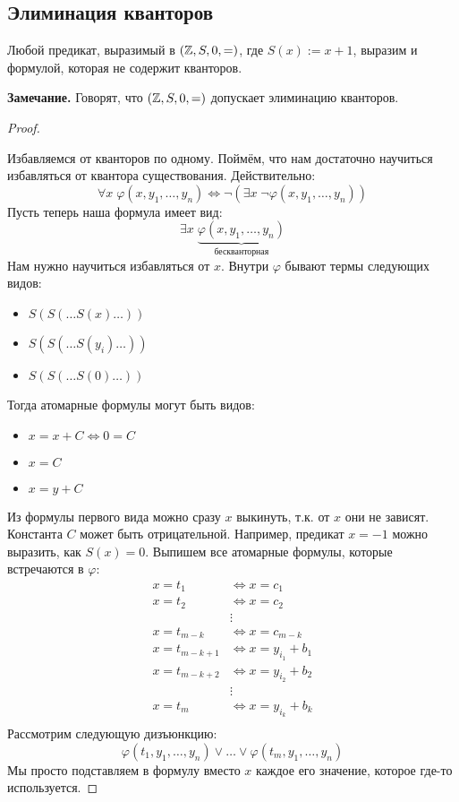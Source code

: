 \subsection{Элиминация кванторов}
\begin{theorem}
    Любой предикат, выразимый в $(\mathbb{Z}, S, 0, =)$, где $S(x) := x + 1$, выразим и формулой, которая не содержит кванторов.
\end{theorem}
\textbf{Замечание. } Говорят, что $(\mathbb{Z}, S, 0, =)$ допускает элиминацию кванторов.
\begin{proof} $ $
     
    Избавляемся от кванторов по одному. Поймём, что нам достаточно научиться избавляться от квантора существования. Действительно:
    $$ \forall x \; \varphi(x, y_1, \dots, y_n) \Longleftrightarrow \lnot \left(\exists x \; \lnot \varphi(x, y_1, \dots, y_n) \right)$$
    Пусть теперь наша формула имеет вид:
    $$ \exists x \; \underbrace{\varphi(x, y_1, \dots, y_n)}_{\text{бескванторная}} $$
    Нам нужно научиться избавляться от $x$. Внутри $\varphi$ бывают термы следующих видов:
    \begin{itemize}
        \item $S(S(\dots S(x)\dots))$
        \item $S(S(\dots S(y_i)\dots))$
        \item $S(S(\dots S(0)\dots))$
    \end{itemize}
    Тогда атомарные формулы могут быть видов:
    \begin{itemize}
        \item $x = x + C \Leftrightarrow 0 = C$
        \item $x = C$
        \item $x = y + C$
    \end{itemize}
    Из формулы первого вида можно сразу $x$ выкинуть, т.к. от $x$ они не зависят. Константа $C$ может быть отрицательной. Например, предикат $x = -1$ можно выразить, как $S(x) = 0$.
    Выпишем все атомарные формулы, которые встречаются в $\varphi$:
    \begin{align*}
        x = t_1 & \Leftrightarrow x = c_1 \\
        x = t_2 & \Leftrightarrow x = c_2 \\
        & \vdots \\
        x = t_{m-k} & \Leftrightarrow x = c_{m-k} \\
        x = t_{m-k+1} & \Leftrightarrow x = y_{i_1} + b_1 \\
        x = t_{m-k+2} & \Leftrightarrow x = y_{i_2} + b_2 \\
        & \vdots \\
        x = t_m & \Leftrightarrow x = y_{i_k} + b_k \\
    \end{align*}
    Рассмотрим следующую дизъюнкцию:
    $$ \varphi(t_1, y_1, \dots, y_n) \vee \dots \vee \varphi(t_m, y_1, \dots, y_n) $$
    Мы просто подставляем в формулу вместо $x$ каждое его значение, которое где-то используется. 
    

\end{proof}
